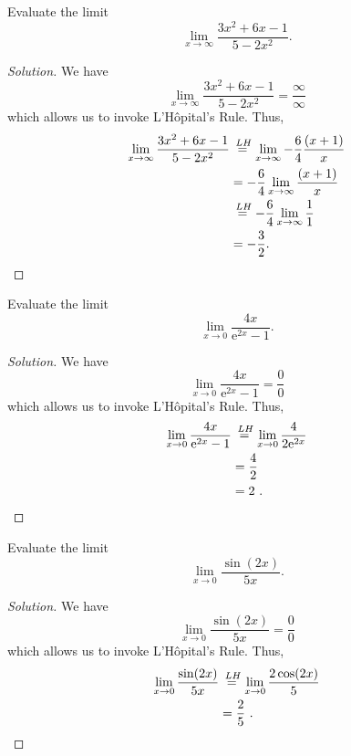 \documentclass[compacto,10pt,comentarios]{aleph-notas}
\newcommand*\Heq{\ensuremath{\overset{\kern2pt LH}{=}}}
\begin{document}
\begin{ejer}
    Evaluate the limit
    $$
        \lim_{x \to \infty} \frac{3x^{2} + 6x - 1}{5 - 2x^{2}}.
    $$
\end{ejer}
\begin{proof}[Solution]
    We have
    $$
        \lim_{x \to \infty} \frac{3x^{2} + 6x - 1}{5 - 2x^{2}} = \frac{\infty}{\infty}
    $$
    which allows us to invoke L’Hôpital's Rule. Thus,
    \begin{align*}
        \lim_{x \to \infty} \frac{3x^{2} + 6x - 1}{5 - 2x^{2}} 
        & \Heq \lim_{x \to \infty} -\frac{6}{4} \frac{(x + 1)}{x} \\
        & = -\frac{6}{4} \lim_{x \to \infty} \frac{(x + 1)}{x} \\
        & \Heq -\frac{6}{4} \lim_{x \to \infty} \frac{1}{1} \\
        & = -\frac{3}{2} .
    \end{align*}
\end{proof}

\begin{ejer}
    Evaluate the limit
    $$
        \lim_{x \to 0} \frac{4x}{\mathrm{e}^{2x} - 1}.
    $$
\end{ejer}
\begin{proof}[Solution]
    We have
    $$
    \lim_{x \to 0} \frac{4x}{\mathrm{e}^{2x} - 1} = \frac{0}{0}
    $$
    which allows us to invoke L’Hôpital's Rule. Thus,
    \begin{align*}
        \lim_{x \to 0} \frac{4x}{\mathrm{e}^{2x} - 1}
        & \Heq \lim_{x \to 0} \frac{4}{2\mathrm{e}^{2x}} \\
        & = \frac{4}{2} \\
        & = 2 ~ .
    \end{align*}
\end{proof}

\begin{ejer}
    Evaluate the limit
    $$
        \lim_{x \to 0} \frac{\sin(2x)}{5x}.
    $$
\end{ejer}
\begin{proof}[Solution]
    We have
    $$
    \lim_{x \to 0} \frac{\sin(2x)}{5x} = \frac{0}{0}
    $$
    which allows us to invoke L’Hôpital's Rule. Thus,
    \begin{align*}
        \lim_{x \to 0} \frac{\sin(2x)}{5x}
        & \Heq \lim_{x \to 0} \frac{2\cos(2x)}{5} \\
        & = \frac{2}{5} ~ .
    \end{align*}
\end{proof}
\end{document}
